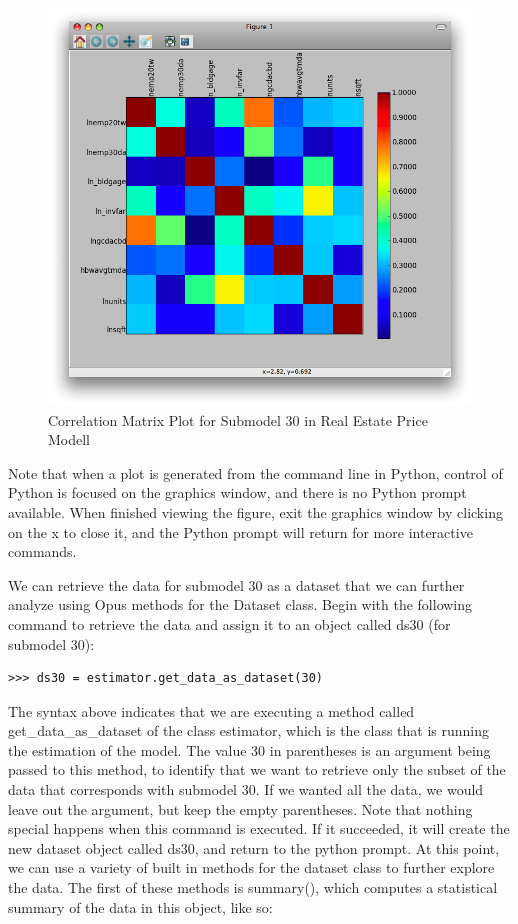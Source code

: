 \begin{figure}[htp]
\begin{center}
\includegraphics[scale=0.35]{graphics/correlation30.png}
\end{center}
\caption{Correlation Matrix Plot for Submodel 30 in Real Estate Price Modell}
\label{fig:correlation30}
\end{figure}

Note that when a plot is generated from the command line in
Python, control of Python is focused on the graphics window,
and there is no Python prompt available.  When finished
viewing the figure, exit the graphics window by clicking on
the x to close it, and the Python prompt will return for
more interactive commands.

We can retrieve the data for submodel 30 as a dataset that
we can further analyze using Opus methods for the Dataset
class.  Begin with the following command to retrieve the
data and assign it to an object called ds30 (for submodel
30):

\begin{verbatim}
>>> ds30 = estimator.get_data_as_dataset(30)
\end{verbatim}

The syntax above indicates that we are executing a method
called get\_data\_as\_dataset of the class estimator, which
is the class that is running the estimation of the model.
The value 30 in parentheses is an argument being passed to
this method, to identify that we want to retrieve only the
subset of the data that corresponds with submodel 30.  If we
wanted all the data, we would leave out the argument, but
keep the empty parentheses.  Note that nothing special
happens when this command is executed.  If it succeeded, it
will create the new dataset object called ds30, and return
to the python prompt.  At this point, we can use a variety
of built in methods for the dataset class to further explore
the data.  The first of these methods is summary(), which
computes a statistical summary of the data in this object,
like so:
\\

